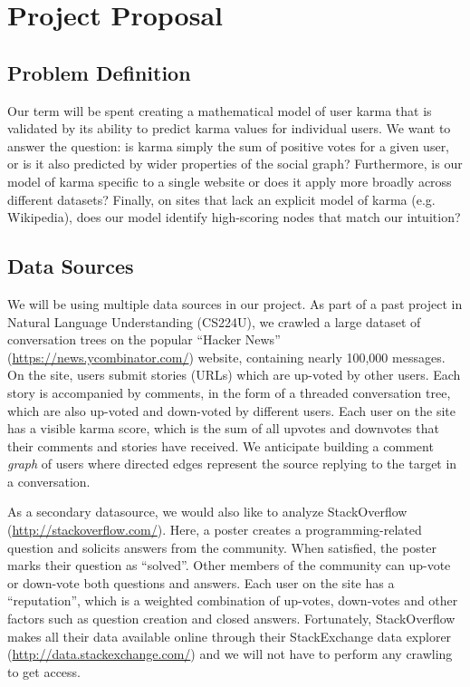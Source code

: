 \documentclass[10pt]{article}
\begin{document}
\section{Project Proposal} \subsection{Problem Definition}
Our term will be spent creating a mathematical model of user karma that is
validated by its ability to predict karma values for individual users. We want
to answer the question: is karma simply the sum of positive votes for a given
user, or is it also predicted by wider properties of the social graph?
Furthermore, is our model of karma specific to a single website or does it apply
more broadly across different datasets?  Finally, on sites that lack an explicit
model of karma (e.g. Wikipedia), does our model identify high-scoring nodes that
match our intuition?

\subsection{Data Sources}
We will be using multiple data sources in our project. As part of a past
project in Natural Language Understanding (CS224U), we crawled a large dataset
of conversation trees on the popular ``Hacker News''
(\url{https://news.ycombinator.com/}) website, containing nearly 100,000
messages. On the site, users submit stories (URLs) which are up-voted by other
users. Each story is accompanied by comments, in the form of a threaded
conversation tree, which are also up-voted and down-voted by different users.
Each user on the site has a visible karma score, which is the sum of all
upvotes and downvotes that their comments and stories have received.  We
anticipate building a comment \textit{graph} of users where directed edges
represent the source replying to the target in a conversation.

As a secondary datasource, we would also like to analyze StackOverflow
(\url{http://stackoverflow.com/}). Here, a poster creates a programming-related
question and solicits answers from the community. When satisfied, the poster
marks their question as ``solved''. Other members of the community can up-vote
or down-vote both questions and answers. Each user on the site has a
``reputation'', which is a weighted combination of up-votes, down-votes and
other factors such as question creation and closed answers. Fortunately,
StackOverflow makes all their data available online through their StackExchange
data explorer (\url{http://data.stackexchange.com/}) and we will not have to
perform any crawling to get access.
\end{document}
